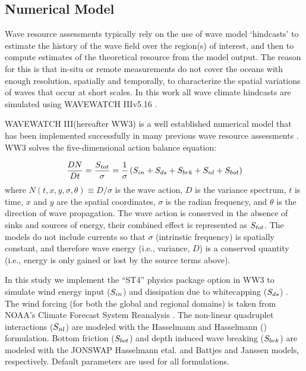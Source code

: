 \subsection{Numerical Model} \label{sec:method:model}

Wave resource assessments typically rely on the use of wave model `hindcasts' to estimate the history of the wave field over the region(s) of interest, and then to compute estimates of the theoretical resource from the model output. The reason for this is that in-situ or remote measurements do not cover the oceans with enough resolution, spatially and temporally, to characterize the spatial variations of waves that occur at short scales. 
In this work all wave climate hindcasts are simulated using WAVEWATCH III\textregistered v5.16 \citep{tolmanDistributedmemoryConceptsWave2002,tolmanwavewatch}.

WAVEWATCH III\textregistered (hereafter WW3) is a  well established numerical model that has been implemented successfully in many previous wave resource assessments \citep[e.g.,][]{garcia-medinaWaveResourceAssessment2014,hemerRevisedAssessmentAustralia2017,yangWaveModelTest2017}.
WW3 solves the five-dimensional action balance equation:

\begin{align}
  \frac{DN}{Dt} = \frac{S_{ tot }}{\sigma} = \frac{1}{\sigma}\left ( S_{ in } + S_{ ds } + S_{ brk } + S_{ nl } + S_{ bot } \right )
\end{align}
where $N(t,x,y,\sigma,\theta) \equiv D/\sigma$ is the wave action, $D$ is the variance spectrum, $t$ is time, $x$ and $y$ are the spatial coordinates, $\sigma$ is the radian frequency, and $\theta$ is the direction of wave propagation.
The wave action is conserved in the absence of sinks and sources of energy, their combined effect is represented as $S_{ tot }$.
The models do not include currents so that $\sigma$ (intrinstic frequency) is spatially constant, and therefore wave energy (i.e., variance, $D$) is a conserved quantity (i.e., energy is only gained or lost by the source terms above).

In this study we implement the ``ST4'' physics package option in WW3 to simulate wind energy input ($S_{ in }$) and dissipation due to whitecapping ($S_{ ds }$) \citep{ardhuinObservationSwellDissipation2009}.
The wind forcing (for both the global and regional domains) is taken from NOAA's Climate Forecast System Reanalysis \citep{sahaNCEPClimateForecast2010}. The non-linear quadruplet interactions ($S_{ nl }$) are modeled with the Hasselmann and Hasselmann (\citeyear{hasselmannComputationsParameterizationsNonlinear1985}) formulation. Bottom friction ($S_{ bot }$) and depth induced wave breaking ($S_{ brk }$) are modeled with the JONSWAP Hasselmann etal. \citeyear{hasselmannMeasurementsWindwaveGrowth1973} and Battjes and Janssen \citeyear{battjesEnergyLossSetup1978} models, respectively. Default parameters are used for all formulations.

